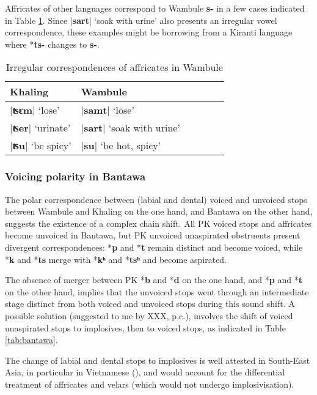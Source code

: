 \documentclass[oneside,a4paper,11pt]{article}
\newcommand{\ipa}[1]{\textbf{{\phon\mbox{#1}}}} %
\newcommand{\dhatu}[2]{|\ipa{#1}| `#2'}
\begin{document}
Affricates of other languages correspond to Wambule \ipa{s-} in a few cases indicated in Table \ref{tab:affricates.wambule}. Since \dhatu{sart}{soak with urine} also presents an irregular vowel correspondence, these examples might  be borrowing from a Kiranti language where *\ipa{ts-} changes to \ipa{s-}.

\begin{table}[H]
\caption{Irregular correspondences of affricates in Wambule} \centering \label{tab:affricates.wambule}
\begin{tabular}{llllll}
\toprule
Khaling & Wambule \\
\midrule
\dhatu{ʦɛm}{lose} & \dhatu{samt}{lose}\\
\dhatu{ʦer}{urinate} & \dhatu{sart}{soak with urine} \\
\dhatu{ʦu}{be spicy} & \dhatu{su}{be hot, spicy}\\
\bottomrule
\end{tabular}
\end{table}

\subsubsection{Voicing polarity in Bantawa} \label{sec:fourth}
The polar correspondence between (labial and dental) voiced and unvoiced stops between Wambule and Khaling on the one hand, and Bantawa on the other hand, suggests the existence of a complex chain shift. All PK voiced stops and affricates become unvoiced in Bantawa, but PK unvoiced unaspirated obstruents  present divergent correspondences: *\ipa{p} and *\ipa{t} remain distinct and become voiced, while *\ipa{k} and *\ipa{ts} merge with *\ipa{kʰ} and *\ipa{tsʰ} and become aspirated.

The absence of merger between PK *\ipa{b} and *\ipa{d} on the one hand, and *\ipa{p} and *\ipa{t} on the other hand, implies that the unvoiced stops went through an intermediate stage distinct from both voiced and unvoiced stops during this sound shift. A possible solution (suggested to me by XXX, p.c.), involves the shift of voiced unaspirated stops to implosives, then to voiced stops, as indicated in Table \ref{tab:bantawa}.

The change of labial and dental stops to implosives is well attested in South-East Asia, in particular in Vietnamese (\citealt{ferlus82spirantisation}), and would account for the differential treatment of affricates and velars (which would not undergo implosivisation). 
\end{document}
